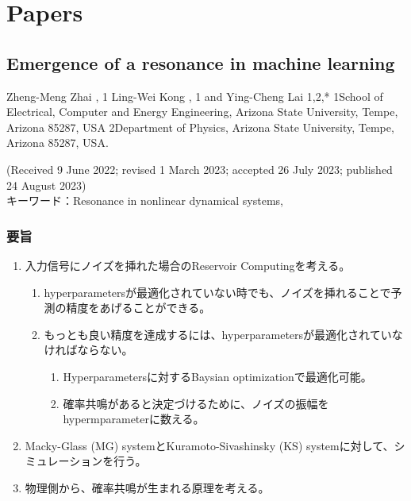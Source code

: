 \section{Papers}
\subsection{Emergence of a resonance in machine learning}
Zheng-Meng Zhai , 1 Ling-Wei Kong , 1 and Ying-Cheng Lai 1,2,*
1School of Electrical, Computer and Energy Engineering, Arizona State University, Tempe, Arizona 85287, USA
2Department of Physics, Arizona State University, Tempe, Arizona 85287, USA.

\noindent (Received 9 June 2022; revised 1 March 2023; accepted 26 July 2023; published 24 August 2023)
\\

\noindent キーワード：Resonance in nonlinear dynamical systems, 

\subsubsection{要旨}

\begin{enumerate}
  \item 入力信号にノイズを挿れた場合のReservoir Computingを考える。\begin{enumerate}
    \item hyperparametersが最適化されていない時でも、ノイズを挿れることで予測の精度をあげることができる。
    \item もっとも良い精度を達成するには、hyperparametersが最適化されていなければならない。\begin{enumerate}
      \item Hyperparametersに対するBaysian optimizationで最適化可能。
      \item 確率共鳴があると決定づけるために、ノイズの振幅をhypermparameterに数える。
    \end{enumerate}
  \end{enumerate} 
  \item Macky-Glass (MG) systemとKuramoto-Sivashinsky (KS) systemに対して、シミュレーションを行う。
  \item 物理側から、確率共鳴が生まれる原理を考える。
\end{enumerate}

